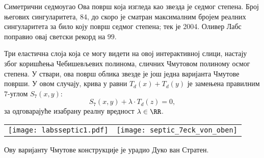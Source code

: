 \begin{surferPage}{Симетрични седмоугао}
    Ова површ која изгледа као звезда је седмог степена. Број његових сингуларитета, $84$, 
	до скоро је сматран максималним бројем реалних сингуларитета за било коју површ седмог степена;
    тек је 2004. Оливер Лабс поправио овај светски рекорд на $99$.
  
  
 Три еластична слоја која се могу видети на овој интерактивној слици, 
    настају због коришћења Чебишевљевих полинома, сличних Чмутовом 
    полиному осмог степена. 
    У ствари, ова површ облика звезде је још једна варијанта Чмутове површи.
    У овом случају, крива у равни $T_d(x)+T_d(y)$ је замењена правилним $7$-углом
    $S_7(x,y)$: 
   \[S_7(x,y) + \lambda \cdot T_d(z) = 0,\]
    за одговарајуће изабрану реалну вредност $\lambda\in\RR$. 
    \vspace*{-0.3em}
    \begin{center}
      \begin{tabular}{c@{\qquad}c}
        \texttt{[image: labsseptic1.pdf]}
        &
        \texttt{[image: septic\_7eck\_von\_oben]}
      \end{tabular}
    \end{center}
    \vspace*{-0.3em}   
   Ову варијанту Чмутове конструкције је урадио Дуко ван Стратен.
\end{surferPage}
